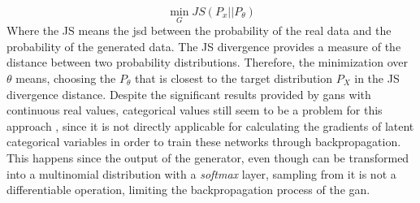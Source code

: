 \begin{equation}
\min_{G} JS(P_{x}||P_{\theta})
\end{equation}
Where the JS means the \acl{jsd} between the probability of the real data and the probability of the generated data. The JS divergence provides a measure of the distance between two probability distributions. Therefore, the minimization over $\theta$ means, choosing the $P_{\theta}$ that is closest to the target distribution $P_{X}$ in the JS divergence distance. Despite the significant results provided by \acp{gan} with continuous real values, categorical values still seem to be a problem for this approach \cite{kusner_gans_2016}, since it is not directly applicable for calculating the gradients of latent categorical variables in order to train these networks through backpropagation. This happens since the output of the generator, even though can be transformed into a multinomial distribution with a \textit{softmax} layer, sampling from it is not a differentiable operation, limiting the backpropagation process of the \ac{gan}.


